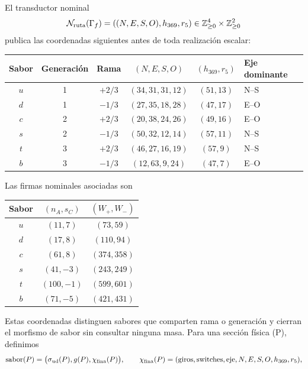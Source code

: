 El transductor nominal
\begin{equation}
 \mathcal N_{\rm ruta}(\Gamma_f)
 =((N,E,S,O),h_{369},r_5)
 \in\mathbb Z_{\ge0}^{4}\times\mathbb Z_{\ge0}^{2}
 \label{eq:transductor-nominal-quark-rev2}
\end{equation}
publica las coordenadas siguientes antes de toda realización escalar:
\begin{center}
\small
\begin{tabularx}{0.96\textwidth}{@{}c c c c c X@{}}
\toprule
\textbf{Sabor} & \textbf{Generación} & \textbf{Rama} &
\textbf{\((N,E,S,O)\)} & \textbf{\((h_{369},r_5)\)} &
\textbf{Eje dominante}\\
\midrule
\(u\)&1&\(+2/3\)&\((34,31,31,12)\)&\((51,13)\)&N--S\\
\(d\)&1&\(-1/3\)&\((27,35,18,28)\)&\((47,17)\)&E--O\\
\(c\)&2&\(+2/3\)&\((20,38,24,26)\)&\((49,16)\)&E--O\\
\(s\)&2&\(-1/3\)&\((50,32,12,14)\)&\((57,11)\)&N--S\\
\(t\)&3&\(+2/3\)&\((46,27,16,19)\)&\((57,9)\)&N--S\\
\(b\)&3&\(-1/3\)&\((12,63,9,24)\)&\((47,7)\)&E--O\\
\bottomrule
\end{tabularx}
\end{center}
Las firmas nominales asociadas son
\begin{center}
\small
\begin{tabular}{@{}c c c@{}}
\toprule
\textbf{Sabor} & \textbf{\((n_A,s_C)\)} & \textbf{\((W_+,W_-)\)}\\
\midrule
\(u\)&\((11,7)\)&\((73,59)\)\\
\(d\)&\((17,8)\)&\((110,94)\)\\
\(c\)&\((61,8)\)&\((374,358)\)\\
\(s\)&\((41,-3)\)&\((243,249)\)\\
\(t\)&\((100,-1)\)&\((599,601)\)\\
\(b\)&\((71,-5)\)&\((421,431)\)\\
\bottomrule
\end{tabular}
\end{center}
Estas coordenadas distinguen sabores que comparten rama o generación y cierran
el morfismo de sabor sin consultar ninguna masa. Para una sección física (P),
definimos
\begin{equation}
 \operatorname{sabor}(P)
 =\bigl(\sigma_{\rm ud}(P),g(P),\chi_{\rm fina}(P)\bigr),
 \qquad
 \chi_{\rm fina}(P)
 =(\text{giros},\text{switches},\text{eje},N,E,S,O,h_{369},r_5),
 \label{eq:morfismo-sabor-ruta-cerrado-rev2}
\end{equation}
